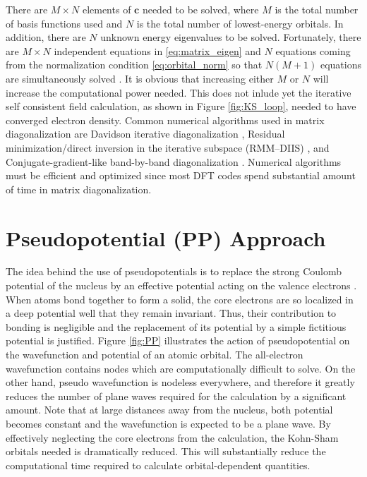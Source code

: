 There are $M \times N$ elements of $\bm{c}$ needed to be solved, where $M$ is the total number of basis functions used and $N$ is the total number of lowest-energy orbitals. In addition, there are $N$ unknown energy eigenvalues to be solved. Fortunately, there are $M \times N$ independent equations in \eqref{eq:matrix_eigen} and $N$ equations coming from the normalization condition \eqref{eq:orbital_norm} so that $N(M+1)$  equations are simultaneously solved \citep{Cottenier2013}. It is obvious that increasing either $M$ or $N$ will increase the computational power needed. This does not inlude yet the  iterative self consistent field calculation, as shown in Figure \ref{fig:KS_loop}, needed to have converged electron density.
Common numerical algorithms used in matrix diagonalization are Davidson iterative diagonalization \citep{Davidson1975,Crouzeix1994}, Residual minimization/direct inversion in the iterative subspace (RMM–DIIS) \citep{Wood1985,Rayson2008}, and Conjugate-gradient-like band-by-band diagonalization \citep{Vorst1988,Kresse1996}. Numerical algorithms must be efficient and optimized since  most DFT codes spend substantial amount of time in matrix diagonalization.

\section{Pseudopotential (PP) Approach}
The idea behind the use of pseudopotentials is to replace the strong Coulomb potential of the nucleus by an effective potential acting on the valence electrons \citep{Phillips1958,Phillips1959,Cohen1970}. When atoms bond together to form a solid, the core electrons are so localized in a deep potential well that they remain invariant. Thus, their contribution to bonding is negligible and the replacement of its potential by a simple fictitious potential is justified. Figure \ref{fig:PP} illustrates the action of pseudopotential on the wavefunction and potential of an atomic orbital. The all-electron wavefunction contains nodes which are  computationally difficult to  solve. On the other hand, pseudo wavefunction is nodeless everywhere, and therefore  it greatly reduces the number of plane waves required for the calculation by a significant amount. Note that at large distances away from the nucleus, both potential becomes constant and the wavefunction is expected to be a plane wave. By effectively neglecting the core electrons from the calculation, the Kohn-Sham orbitals needed is dramatically reduced. This will substantially reduce the computational time required to calculate orbital-dependent quantities.

